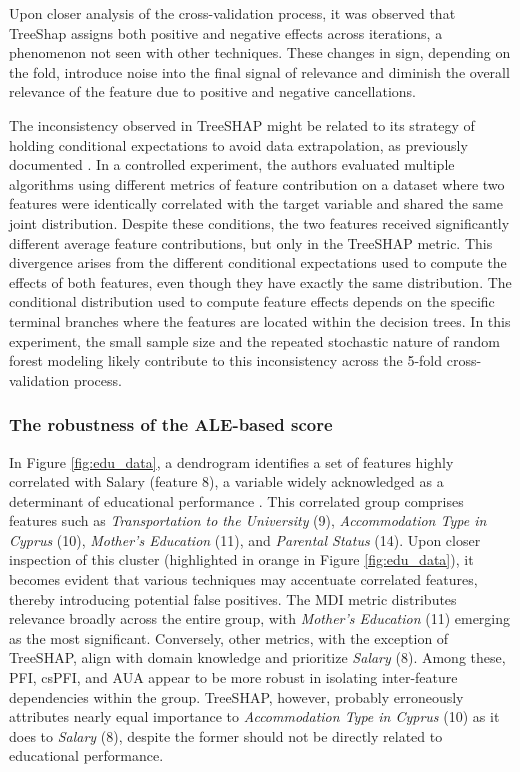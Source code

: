 Upon closer analysis of the cross-validation process, it was observed that TreeShap assigns both positive and negative effects across iterations, a phenomenon not seen with other techniques. These changes in sign, depending on the fold, introduce noise into the final signal of relevance and diminish the overall relevance of the feature due to positive and negative cancellations.

The inconsistency observed in TreeSHAP might be related to its strategy of holding conditional expectations to avoid data extrapolation, as previously documented \cite{SilvaFilho2023AAchievement}. In a controlled experiment, the authors evaluated multiple algorithms using different metrics of feature contribution on a dataset where two features were identically correlated with the target variable and shared the same joint distribution. Despite these conditions, the two features received significantly different average feature contributions, but only in the TreeSHAP metric. This divergence arises from the different conditional expectations used to compute the effects of both features, even though they have exactly the same distribution. The conditional distribution used to compute feature effects depends on the specific terminal branches where the features are located within the decision trees. In this experiment, the small sample size and the repeated stochastic nature of random forest modeling likely contribute to this inconsistency across the 5-fold cross-validation process.

\subsubsection{The robustness of the ALE-based score}

In Figure \ref{fig:edu_data}, a dendrogram identifies a set of features highly correlated with Salary (feature 8), a variable widely acknowledged as a determinant of educational performance \cite{coleman1968equality, coleman2019equality}. This correlated group comprises features such as \textit{Transportation to the University} (9), \textit{Accommodation Type in Cyprus} (10), \textit{Mother's Education} (11), and\textit{ Parental Status} (14). Upon closer inspection of this cluster (highlighted in orange in Figure \ref{fig:edu_data}), it becomes evident that various techniques may accentuate correlated features, thereby introducing potential false positives. The \gls{MDI} metric distributes relevance broadly across the entire group, with \textit{Mother's Education} (11) emerging as the most significant. Conversely, other metrics, with the exception of TreeSHAP, align with domain knowledge and prioritize \textit{Salary} (8). Among these, \gls{PFI}, \gls{csPFI}, and \gls{AUA} appear to be more robust in isolating inter-feature dependencies within the group. TreeSHAP, however, probably erroneously attributes nearly equal importance to \textit{Accommodation Type in Cyprus} (10) as it does to \textit{Salary} (8), despite the former should not be directly related to educational performance.



